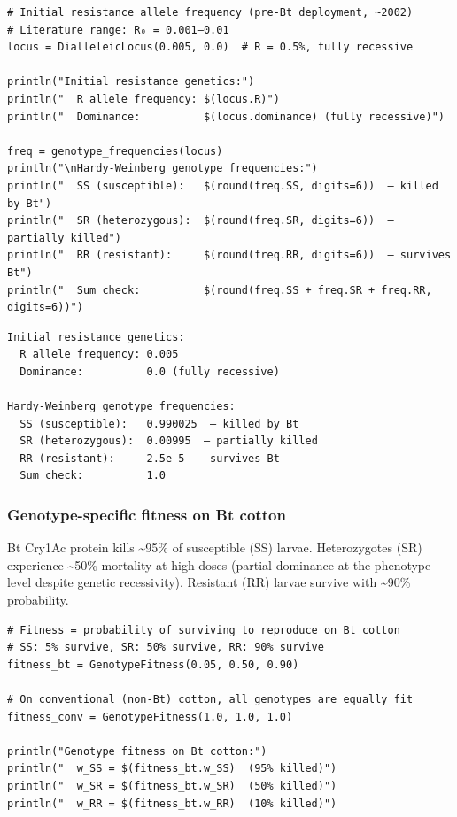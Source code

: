 \begin{verbatim}
# Initial resistance allele frequency (pre-Bt deployment, ~2002)
# Literature range: R₀ = 0.001–0.01
locus = DialleleicLocus(0.005, 0.0)  # R = 0.5%, fully recessive

println("Initial resistance genetics:")
println("  R allele frequency: $(locus.R)")
println("  Dominance:          $(locus.dominance) (fully recessive)")

freq = genotype_frequencies(locus)
println("\nHardy-Weinberg genotype frequencies:")
println("  SS (susceptible):   $(round(freq.SS, digits=6))  — killed by Bt")
println("  SR (heterozygous):  $(round(freq.SR, digits=6))  — partially killed")
println("  RR (resistant):     $(round(freq.RR, digits=6))  — survives Bt")
println("  Sum check:          $(round(freq.SS + freq.SR + freq.RR, digits=6))")
\end{verbatim}




\begin{verbatim}
Initial resistance genetics:
  R allele frequency: 0.005
  Dominance:          0.0 (fully recessive)

Hardy-Weinberg genotype frequencies:
  SS (susceptible):   0.990025  — killed by Bt
  SR (heterozygous):  0.00995  — partially killed
  RR (resistant):     2.5e-5  — survives Bt
  Sum check:          1.0
\end{verbatim}



\subsubsection{Genotype-specific fitness on Bt cotton}



\label{13444721140464647292}{}


Bt Cry1Ac protein kills {\textasciitilde}95\% of susceptible (SS) larvae. Heterozygotes (SR) experience {\textasciitilde}50\% mortality at high doses (partial dominance at the phenotype level despite genetic recessivity). Resistant (RR) larvae survive with {\textasciitilde}90\% probability.




\begin{verbatim}
# Fitness = probability of surviving to reproduce on Bt cotton
# SS: 5% survive, SR: 50% survive, RR: 90% survive
fitness_bt = GenotypeFitness(0.05, 0.50, 0.90)

# On conventional (non-Bt) cotton, all genotypes are equally fit
fitness_conv = GenotypeFitness(1.0, 1.0, 1.0)

println("Genotype fitness on Bt cotton:")
println("  w_SS = $(fitness_bt.w_SS)  (95% killed)")
println("  w_SR = $(fitness_bt.w_SR)  (50% killed)")
println("  w_RR = $(fitness_bt.w_RR)  (10% killed)")
\end{verbatim}




